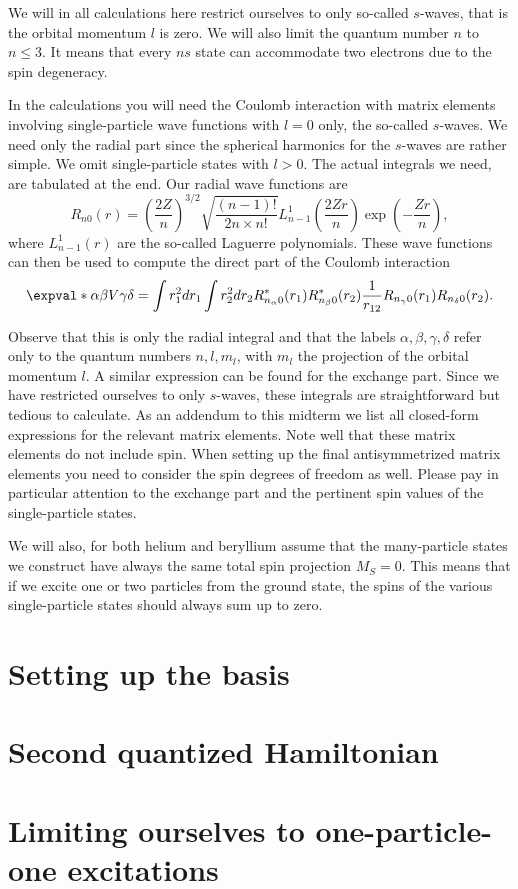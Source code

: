 \documentclass{article}
\begin{document}
We will in all calculations here restrict ourselves to only so-called \(s\)-waves, that is the orbital momentum \(l\) is zero.
We will also limit the quantum number \(n\) to \(n \le 3\).
It means that every \(ns\) state can accommodate two electrons due to the spin degeneracy.

In the calculations you will need the Coulomb interaction with matrix elements involving single-particle wave functions with \(l = 0\) only, the
so-called \(s\)-waves.
We need only the radial part since the spherical harmonics for the \(s\)-waves are rather simple.
We omit single-particle states with \(l > 0\).
The actual integrals we need, are tabulated at the end.
Our radial wave functions are
\begin{equation*}
    R_{n0}(r) = \left( \frac{2Z}{n} \right)^{3/2} \sqrt{\frac{(n-1)!}{2n\times n!}} L_{n-1}^1 \left( \frac{2Zr}{n} \right) \exp{\left( -\frac{Zr}{n} \right)},
\end{equation*}
where \(L_{n-1}^1(r)\) are the so-called Laguerre polynomials.
These wave functions can then be used to compute the direct part of the Coulomb interaction
\begin{equation*}
    \expval*{\alpha\beta}{V}{\gamma\delta} = \int r_1^2 dr_1 \int r_2^2 dr_2 R_{n_{\alpha} 0}^*(r_1) R_{n_{\beta} 0}^*(r_2) \frac{1}{r_{12}}R_{n_{\gamma} 0}(r_1) R_{n_{\delta} 0}(r_2).
\end{equation*}

Observe that this is only the radial integral and that the labels \( \alpha,\beta,\gamma,\delta \) refer only to the quantum numbers \(n,l,m_l\), with \(m_l\) the projection of the orbital momentum \(l\).
A similar expression can be found for the exchange part.
Since we have restricted ourselves to only \(s\)-waves, these integrals are straightforward but tedious to calculate.
As an addendum to this midterm we list all closed-form expressions for the relevant matrix elements.
Note well that these matrix elements do not include spin.
When setting up the final antisymmetrized matrix elements you need to consider the spin degrees of freedom as well.
Please pay in particular attention to the exchange part and the pertinent spin values of the single-particle states.

We will also, for both helium and beryllium assume that the many-particle states we construct have always the same total spin projection \(M_S = 0\).
This means that if we excite one or two particles from the ground state, the spins of the various single-particle states should always sum up to zero.

\section{Setting up the basis}


\section{Second quantized Hamiltonian}
% 

\section{Limiting ourselves to one-particle-one excitations}

\end{document}
